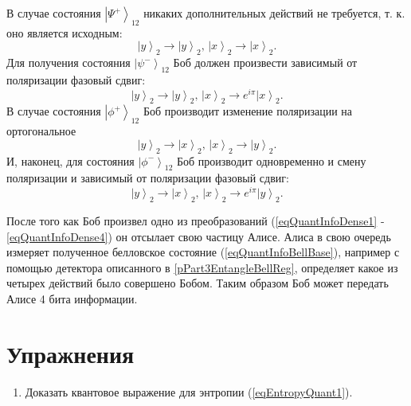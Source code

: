 В случае состояния $\left|\Psi^{+}\right>_{12}$ никаких
дополнительных действий не требуется, т. к. оно является исходным: 
\begin{equation}
\left|y\right>_2 \rightarrow \left|y\right>_2, \, 
\left|x\right>_2 \rightarrow \left|x\right>_2.
\label{eqQuantInfoDense1}
\end{equation}
Для получения состояния $\left|\psi^{-}\right>_{12}$ Боб должен
произвести зависимый от поляризации фазовый сдвиг:
\begin{equation}
\left|y\right>_2 \rightarrow \left|y\right>_2, \, 
\left|x\right>_2 \rightarrow e^{i \pi}\left|x\right>_2.
\label{eqQuantInfoDense2}
\end{equation}
В случае состояния $\left|\phi^{+}\right>_{12}$ Боб производит
изменение поляризации на ортогональное
\begin{equation}
\left|y\right>_2 \rightarrow \left|x\right>_2, \, 
\left|x\right>_2 \rightarrow \left|y\right>_2.
\label{eqQuantInfoDense3}
\end{equation}
И, наконец, для состояния $\left|\phi^{-}\right>_{12}$ Боб производит
одновременно и смену поляризации и зависимый от поляризации фазовый
сдвиг:
\begin{equation}
\left|y\right>_2 \rightarrow \left|x\right>_2, \, 
\left|x\right>_2 \rightarrow e^{i \pi}\left|y\right>_2.
\label{eqQuantInfoDense4}
\end{equation}

После того как Боб произвел одно из преобразований
(\ref{eqQuantInfoDense1} - \ref{eqQuantInfoDense4}) он отсылает свою
частицу Алисе. Алиса в свою очередь измеряет полученное белловское
состояние (\ref{eqQuantInfoBellBase}), например с помощью детектора
описанного в \ref{pPart3EntangleBellReg}, определяет какое из четырех
действий было совершено Бобом. Таким образом Боб может передать Алисе
4 бита информации.




\section{Упражнения}
\begin{enumerate}
\item Доказать квантовое выражение для энтропии  (\ref{eqEntropyQuant1}).  
\end{enumerate}


